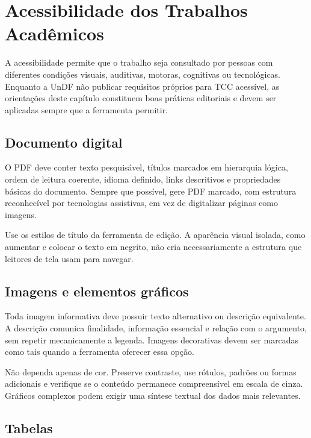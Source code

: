 \chapter{Acessibilidade dos Trabalhos Acadêmicos}
\label{chap:acessibilidade}

A acessibilidade permite que o trabalho seja consultado por pessoas com diferentes condições visuais, auditivas, motoras, cognitivas ou tecnológicas. Enquanto a UnDF não publicar requisitos próprios para TCC acessível, as orientações deste capítulo constituem boas práticas editoriais e devem ser aplicadas sempre que a ferramenta permitir.

\boapratica

\section{Documento digital}

O PDF deve conter texto pesquisável, títulos marcados em hierarquia lógica, ordem de leitura coerente, idioma definido, links descritivos e propriedades básicas do documento. Sempre que possível, gere PDF marcado, com estrutura reconhecível por tecnologias assistivas, em vez de digitalizar páginas como imagens.

Use os estilos de título da ferramenta de edição. A aparência visual isolada, como aumentar e colocar o texto em negrito, não cria necessariamente a estrutura que leitores de tela usam para navegar.

\section{Imagens e elementos gráficos}

Toda imagem informativa deve possuir texto alternativo ou descrição equivalente. A descrição comunica finalidade, informação essencial e relação com o argumento, sem repetir mecanicamente a legenda. Imagens decorativas devem ser marcadas como tais quando a ferramenta oferecer essa opção.

Não dependa apenas de cor. Preserve contraste, use rótulos, padrões ou formas adicionais e verifique se o conteúdo permanece compreensível em escala de cinza. Gráficos complexos podem exigir uma síntese textual dos dados mais relevantes.

\section{Tabelas}

